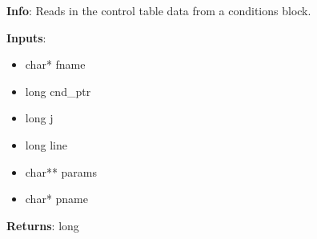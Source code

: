\textbf{Info}: Reads in the control table data from a conditions block.

\noindent \textbf{Inputs}:
\begin{itemize}
\item{char* fname}
\item{long cnd\_ptr}
\item{long j}
\item{long line}
\item{char** params}
\item{char* pname}
\end{itemize}

\noindent \textbf{Returns}: long
